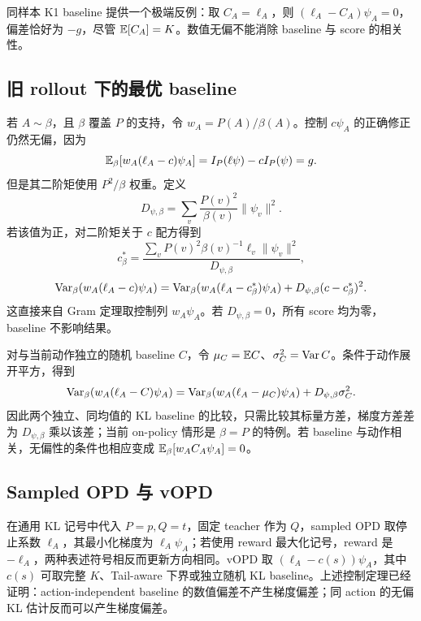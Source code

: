 同样本 K1 baseline 提供一个极端反例：取 $C_A=\ell_A$，则 $(\ell_A-C_A)\psi_A=0$，偏差恰好为 $-g$，尽管 $\mathbb E[C_A]=K$。数值无偏不能消除 baseline 与 score 的相关性。

\subsection{旧 rollout 下的最优 baseline}

若 $A\sim\beta$，且 $\beta$ 覆盖 $P$ 的支持，令 $w_A=P(A)/\beta(A)$。控制 $c \psi_A$ 的正确修正仍然无偏，因为
\begin{equation*}
 \mathbb E_\beta[w_A(\ell_A-c)\psi_A]=I_P(\ell\psi)-cI_P(\psi)=g.
\end{equation*}
但是其二阶矩使用 $P^2/\beta$ 权重。定义
\begin{equation*}
 D_{\psi,\beta}=\sum_v\frac{P(v)^2}{\beta(v)}\|\psi_v\|^2.
\end{equation*}
若该值为正，对二阶矩关于 $c$ 配方得到
\begin{equation*}
 c_\beta^*=
 \frac{\sum_v P(v)^2\beta(v)^{-1}\ell_v\|\psi_v\|^2}{D_{\psi,\beta}},
\end{equation*}
\begin{equation*}
 \operatorname{Var}_\beta(w_A(\ell_A-c)\psi_A)
 =\operatorname{Var}_\beta(w_A(\ell_A-c_\beta^*)\psi_A)
  +D_{\psi,\beta}(c-c_\beta^*)^2.
\end{equation*}
这直接来自 Gram 定理取控制列 $w_A\psi_A$。若 $D_{\psi,\beta}=0$，所有 score 均为零，baseline 不影响结果。

对与当前动作独立的随机 baseline $C$，令 $\mu_C=\mathbb E C$、$\sigma_C^2=\operatorname{Var} C$。条件于动作展开平方，得到
\begin{equation*}
 \operatorname{Var}_\beta(w_A(\ell_A-C)\psi_A)
 =\operatorname{Var}_\beta(w_A(\ell_A-\mu_C)\psi_A)+D_{\psi,\beta}\sigma_C^2.
\end{equation*}
因此两个独立、同均值的 KL baseline 的比较，只需比较其标量方差，梯度方差差为 $D_{\psi,\beta}$ 乘以该差；当前 on-policy 情形是 $\beta=P$ 的特例。若 baseline 与动作相关，无偏性的条件也相应变成 $\mathbb E_\beta[w_AC_A\psi_A]=0$。

\subsection{Sampled OPD 与 vOPD}

在通用 KL 记号中代入 $P=p,Q=t$，固定 teacher 作为 $Q$，sampled OPD 取停止系数 $\ell_A$，其最小化梯度为 $\ell_A\psi_A$；若使用 reward 最大化记号，reward 是 $-\ell_A$，两种表述符号相反而更新方向相同。vOPD 取 $(\ell_A-c(s))\psi_A$，其中 $c(s)$ 可取完整 $K$、Tail-aware 下界或独立随机 KL baseline。上述控制定理已经证明：action-independent baseline 的数值偏差不产生梯度偏差；同 action 的无偏 KL 估计反而可以产生梯度偏差。

